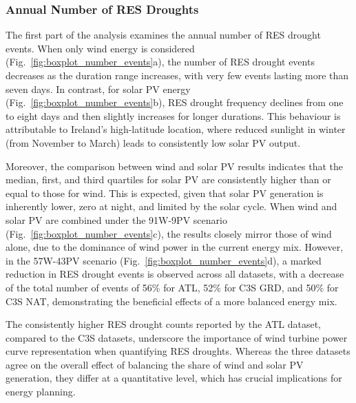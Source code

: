 \documentclass[preprint, 12pt]{elsarticle}
\begin{document}
\subsubsection{Annual Number of RES Droughts}

The first part of the analysis examines the annual number of RES drought events. When only wind energy is considered (Fig.~\ref{fig:boxplot_number_events}a), the number of RES drought events decreases as the duration range increases, with very few events lasting more than seven days. In contrast, for solar PV energy (Fig.~\ref{fig:boxplot_number_events}b), RES drought frequency declines from one to eight days and then slightly increases for longer durations. This behaviour is attributable to Ireland's high-latitude location, where reduced sunlight in winter (from November to March) leads to consistently low solar PV output.

Moreover, the comparison between wind and solar PV results indicates that the median, first, and third quartiles for solar PV are consistently higher than or equal to those for wind. This is expected, given that solar PV generation is inherently lower, zero at night, and limited by the solar cycle. When wind and solar PV are combined under the 91W-9PV scenario (Fig.~\ref{fig:boxplot_number_events}c), the results closely mirror those of wind alone, due to the dominance of wind power in the current energy mix. However, in the 57W-43PV scenario (Fig.~\ref{fig:boxplot_number_events}d), a marked reduction in RES drought events is observed across all datasets, with a decrease of the total number of events of 56\% for ATL, 52\% for C3S GRD, and 50\% for C3S NAT, demonstrating the beneficial effects of a more balanced energy mix.

The consistently higher RES drought counts reported by the ATL dataset, compared to the C3S datasets, underscore the importance of wind turbine power curve representation when quantifying RES droughts. Whereas the three datasets agree on the overall effect of balancing the share of wind and solar PV generation, they differ at a quantitative level, which has crucial implications for energy planning.
\end{document}
